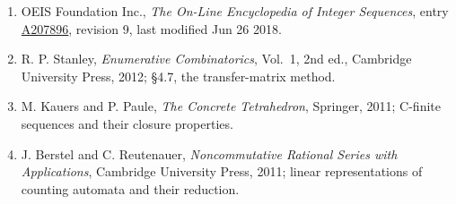 \documentclass[11pt]{article}
\theoremstyle{definition}
\begin{document}
\begin{enumerate}

\item OEIS Foundation Inc., \emph{The On-Line Encyclopedia of Integer Sequences}, entry \href{https://oeis.org/A207896}{A207896}, revision 9, last modified Jun 26 2018.

\item R. P. Stanley, \emph{Enumerative Combinatorics}, Vol.~1, 2nd ed., Cambridge University Press, 2012; \S4.7, the transfer-matrix method.

\item M. Kauers and P. Paule, \emph{The Concrete Tetrahedron}, Springer, 2011; C-finite sequences and their closure properties.

\item J. Berstel and C. Reutenauer, \emph{Noncommutative Rational Series with Applications}, Cambridge University Press, 2011; linear representations of counting automata and their reduction.

\end{enumerate}
\end{document}
